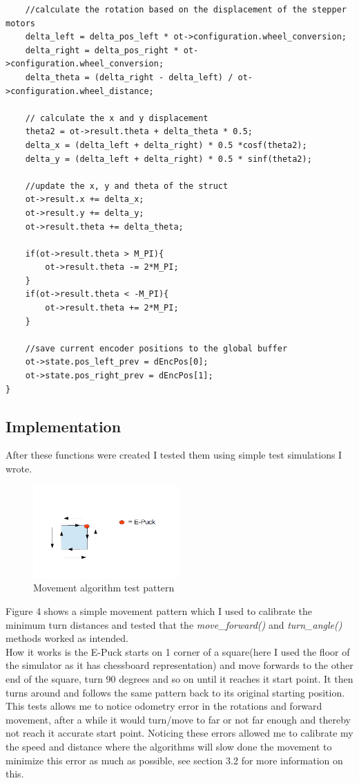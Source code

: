 \documentclass[10pt,a4paper]{article}
\begin{document}
\begin{flushleft}
\begin{lstlisting}
	//calculate the rotation based on the displacement of the stepper motors 
	delta_left = delta_pos_left * ot->configuration.wheel_conversion;
	delta_right = delta_pos_right * ot->configuration.wheel_conversion;
	delta_theta = (delta_right - delta_left) / ot->configuration.wheel_distance;
	
	// calculate the x and y displacement 
	theta2 = ot->result.theta + delta_theta * 0.5;
	delta_x = (delta_left + delta_right) * 0.5 *cosf(theta2);
	delta_y = (delta_left + delta_right) * 0.5 * sinf(theta2);
	
	//update the x, y and theta of the struct
	ot->result.x += delta_x;
	ot->result.y += delta_y;
	ot->result.theta += delta_theta;
	
	if(ot->result.theta > M_PI){
		ot->result.theta -= 2*M_PI;
	}
	if(ot->result.theta < -M_PI){
		ot->result.theta += 2*M_PI;
	}
	
	//save current encoder positions to the global buffer 
	ot->state.pos_left_prev = dEncPos[0];
	ot->state.pos_right_prev = dEncPos[1];
}
\end{lstlisting}

\subsection{Implementation}
After these functions were created I tested them using simple test simulations I wrote.\\

\begin{figure}[h]
\centering
\includegraphics[width = 0.5\textwidth]{figures/movement_test.png} 
\caption{Movement algorithm test pattern}
\label{Figure 4}
\end{figure}

Figure 4 shows a simple movement pattern which I used to calibrate the minimum turn distances and tested that the \textit{move\_forward()} and \textit{turn\_angle()} methods worked as intended. \\
How it works is the E-Puck starts on 1 corner of a square(here I used the floor of the simulator as it has chessboard representation) and move forwards to the other end of the square, turn 90 degrees and so on until it reaches it start point. It then turns around and follows the same pattern back to its original starting position. This tests allows me to notice odometry error in the rotations and forward movement, after a while it would turn/move to far or not far enough and thereby not reach it accurate start point. Noticing these errors allowed me to calibrate my the speed and distance where the algorithms will slow done the movement to minimize this error as much as possible, see section 3.2 for more information on this.\\[3ex]


\end{flushleft}
\end{document}
